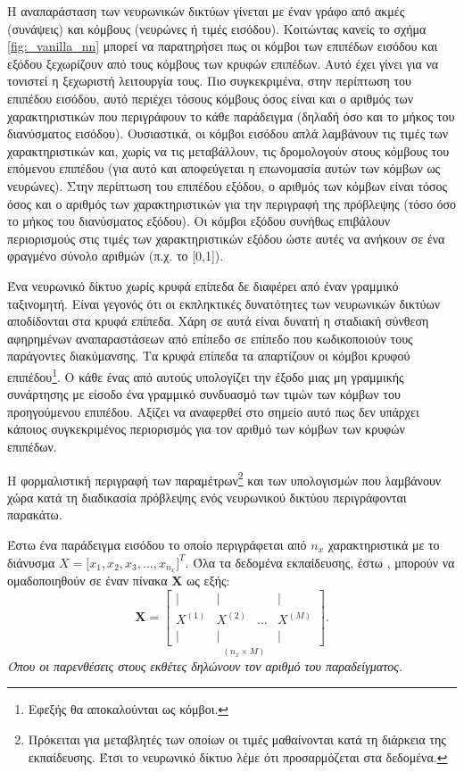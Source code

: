 Η αναπαράσταση των νευρωνικών δικτύων γίνεται με έναν γράφο από ακμές (συνάψεις) και κόμβους (νευρώνες ή τιμές εισόδου). Κοιτώντας κανείς το σχήμα \ref{fig:_vanilla_nn} μπορεί να παρατηρήσει πως οι κόμβοι των επιπέδων εισόδου και εξόδου ξεχωρίζουν από τους κόμβους των κρυφών επιπέδων. Αυτό έχει γίνει για να τονιστεί η ξεχωριστή λειτουργία τους. Πιο συγκεκριμένα, στην περίπτωση του επιπέδου εισόδου, αυτό περιέχει τόσους κόμβους όσος είναι και ο αριθμός των χαρακτηριστικών που περιγράφουν το κάθε παράδειγμα (δηλαδή όσο και το μήκος του διανύσματος εισόδου). Ουσιαστικά, οι κόμβοι εισόδου απλά λαμβάνουν τις τιμές των χαρακτηριστικών και, χωρίς να τις μεταβάλλουν, τις δρομολογούν στους κόμβους του επόμενου επιπέδου (για αυτό και αποφεύγεται η επωνομασία αυτών των κόμβων ως νευρώνες). Στην περίπτωση του επιπέδου εξόδου, ο αριθμός των κόμβων είναι τόσος όσος και ο αριθμός των χαρακτηριστικών για την περιγραφή της πρόβλεψης (τόσο όσο το μήκος του διανύσματος εξόδου). Οι κόμβοι εξόδου συνήθως επιβάλουν περιορισμούς στις τιμές των χαρακτηριστικών εξόδου ώστε αυτές να ανήκουν σε ένα φραγμένο σύνολο αριθμών (π.χ. το [0,1]).
\par

Ένα νευρωνικό δίκτυο χωρίς κρυφά επίπεδα δε διαφέρει από έναν γραμμικό ταξινομητή. Είναι γεγονός ότι οι εκπληκτικές δυνατότητες των νευρωνικών δικτύων αποδίδονται στα κρυφά επίπεδα. Χάρη σε αυτά είναι δυνατή η σταδιακή σύνθεση αφηρημένων αναπαραστάσεων από επίπεδο σε επίπεδο που κωδικοποιούν τους παράγοντες διακύμανσης. Τα κρυφά επίπεδα τα απαρτίζουν οι κόμβοι κρυφού επιπέδου\footnote{Εφεξής θα αποκαλούνται ως κόμβοι.}. Ο κάθε ένας από αυτούς υπολογίζει την έξοδο μιας μη γραμμικής συνάρτησης με είσοδο ένα γραμμικό συνδυασμό των τιμών των κόμβων του προηγούμενου επιπέδου. Αξίζει να αναφερθεί στο σημείο αυτό πως δεν υπάρχει κάποιος συγκεκριμένος περιορισμός για τον αριθμό των κόμβων των κρυφών επιπέδων. \par

Η φορμαλιστική περιγραφή των παραμέτρων\footnote{Πρόκειται για μεταβλητές των οποίων οι τιμές μαθαίνονται κατά τη διάρκεια της εκπαίδευσης. Έτσι το νευρωνικό δίκτυο λέμε ότι προσαρμόζεται στα δεδομένα.} και των υπολογισμών που λαμβάνουν χώρα κατά τη διαδικασία πρόβλεψης ενός νευρωνικού δικτύου περιγράφονται παρακάτω. \par

Έστω ένα παράδειγμα εισόδου το οποίο περιγράφεται από $n_x$ χαρακτηριστικά με το διάνυσμα \(X = \big[x_1, x_2, x_3, \dots, x_{n_{x}}]^T\). Όλα τα δεδομένα εκπαίδευσης, έστω , μπορούν να ομαδοποιηθούν σε έναν πίνακα $\boldsymbol{X}$ ως εξής: 
\begin{equation}
    \boldsymbol{X} =
    \underset{(n_x \times M)}{\begin{bmatrix}
        |&|&&| \\
        X^{(1)} & X^{(2)} & \dots & X^{(M)}\\
        |&|&&|
    \end{bmatrix}}.
\end{equation}
\textit{Όπου οι παρενθέσεις στους εκθέτες δηλώνουν τον αριθμό του παραδείγματος.}\par

